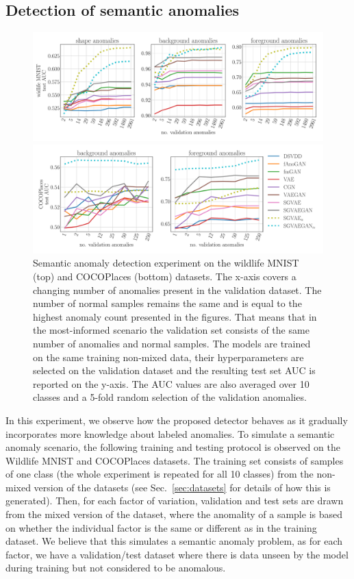 \subsection{Detection of semantic anomalies} 
\begin{figure}[ht!]
    \centering
    \includegraphics[width=\textwidth]{data/chapter_sgvaegan/multifactor_experiments_wmnist.pdf}
    
    \includegraphics[width=\textwidth]{data/chapter_sgvaegan/multifactor_experiments_coco.pdf}
    \caption{Semantic anomaly detection experiment on the wildlife MNIST (top) and COCOPlaces (bottom) datasets. The x-axis covers a changing number of anomalies present in the validation dataset. The number of normal samples remains the same and is equal to the highest anomaly count presented in the figures. That means that in the most-informed scenario the validation set consists of the same number of anomalies and normal samples. The models are trained on the same training non-mixed data, their hyperparameters are selected on the validation dataset and the resulting test set AUC is reported on the y-axis. The AUC values are also averaged over 10 classes and a 5-fold random selection of the validation anomalies.}
    \label{fig:multifactor}
\end{figure}
In this experiment, we observe how the proposed detector behaves as it gradually incorporates more knowledge about labeled anomalies. To simulate a semantic anomaly scenario, the following training and testing protocol is observed on the Wildlife MNIST and COCOPlaces datasets. The training set consists of samples of one class (the whole experiment is repeated for all 10 classes) from the non-mixed version of the datasets (see Sec.~\ref{sec:datasets} for details of how this is generated). Then, for each factor of variation, validation and test sets are drawn from the mixed version of the dataset, where the anomality of a sample is based on whether the individual factor is the same or different as in the training dataset. We believe that this simulates a semantic anomaly problem, as for each factor, we have a validation/test dataset where there is data unseen by the model during training but not considered to be anomalous. 

